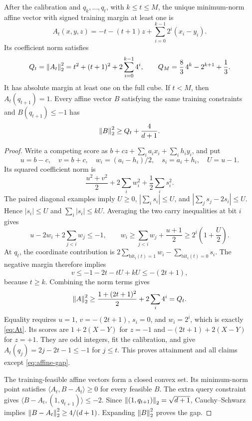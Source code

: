 \begin{lemma}
\label{lem:selector}
After the calibration and $q_k,\ldots,q_t$, with $k\le t\le M$, the
unique minimum-norm affine vector with signed training margin at least
one is
\begin{equation}\label{eq:At}
 A_t(x,y,z)=-t-(t+1)z+\sum_{i=0}^{k-1}2^i(x_i-y_i).
\end{equation}
Its coefficient norm satisfies
\begin{equation}\label{eq:Qt}
 Q_t=\left\lVert A_t\right\rVert_2^2=t^2+(t+1)^2+2\sum_{i=0}^{k-1}4^i,
 \qquad Q_M=\frac83\,4^k-2^{k+1}+\frac13.
\end{equation}
It has absolute margin at least one on the full cube. If $t<M$, then
$A_t(q_{t+1})=1$. Every affine vector $B$ satisfying the same training
constraints and $B(q_{t+1})\le-1$ has
\begin{equation}\label{eq:affine-gap}
 \left\lVert B\right\rVert_2^2\ge Q_t+\frac4{d+1}.
\end{equation}
\end{lemma}
\begin{proof}
Write a competing score as $b+cz+\sum_i a_i x_i+\sum_i h_i y_i$, and put
\[
 u=b-c,\quad v=b+c,\quad w_i=(a_i-h_i)/2,\quad
 s_i=a_i+h_i,\quad U=u-1.
\]
Its squared coefficient norm is
\[
 \frac{u^2+v^2}{2}+2\sum_i w_i^2+\frac12\sum_i s_i^2.
\]
The paired diagonal examples imply $U\ge0$,
$|\sum_i s_i|\le U$, and $|\sum_j s_j-2s_i|\le U$.
Hence $|s_i|\le U$ and $\sum_i|s_i|\le kU$.
Averaging the two carry inequalities at bit $i$ gives
\[
 u-2w_i+2\sum_{j<i}w_j\le-1,
 \qquad
 w_i\ge\sum_{j<i}w_j+\frac{u+1}{2}
       \ge2^i\left(1+\frac U2\right).
\]
At $q_t$, the coordinate contribution is
$2\sum_{\mathrm{bit}_i(t)=1}w_i-\sum_{\mathrm{bit}_i(t)=0}s_i$.
The negative margin therefore implies
\[
 v\le-1-2t-tU+kU\le-(2t+1),
\]
because $t\ge k$. Combining the norm terms gives
\[
 \left\lVert A\right\rVert_2^2\ge\frac{1+(2t+1)^2}{2}+2\sum_i4^i=Q_t.
\]
Equality requires $u=1$, $v=-(2t+1)$, $s_i=0$, and $w_i=2^i$,
which is exactly \eqref{eq:At}. Its scores are
$1+2(X-Y)$ for $z=-1$ and $-(2t+1)+2(X-Y)$ for $z=+1$.
They are odd integers, fit the calibration, and give
$A_t(q_j)=2j-2t-1\le-1$ for $j\le t$. This proves attainment and all
claims except \eqref{eq:affine-gap}.

The training-feasible affine vectors form a closed convex set.
Its minimum-norm point satisfies
$\langle A_t,B-A_t\rangle\ge0$ for every feasible $B$.
The extra query constraint gives
$\langle B-A_t,(1,q_{t+1})\rangle\le-2$.
Since $\left\lVert (1,q_{t+1})\right\rVert_2=\sqrt{d+1}$, Cauchy--Schwarz implies
$\left\lVert B-A_t\right\rVert_2^2\ge4/(d+1)$. Expanding $\left\lVert B\right\rVert_2^2$ proves the gap.
\end{proof}

